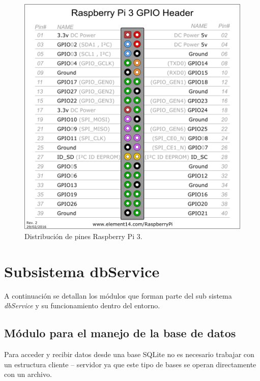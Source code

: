 \begin{figure}[H]
	\centering
	\includegraphics[scale =.3]{./Figures/gpio3.png}
	\caption{Distribución de pines Raspberry Pi 3.}
	\label{fig:gpio3}
\end{figure}

\section{Subsistema dbService}

A continuación se detallan los módulos que forman parte del sub sistema \textit{dbService} y su funcionamiento dentro del entorno.
\subsection{Módulo para el manejo de la base de datos}

Para acceder y recibir datos desde una base SQLite no es necesario trabajar con un estructura cliente – servidor ya que este tipo de bases se operan directamente con un archivo.

